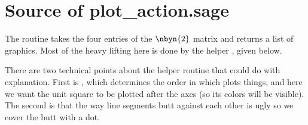 \section{Source of plot\_action.sage}
The 
routine takes the four entries of the $\nbyn{2}$
matrix and returns a list of graphics.
Most of the heavy lifting here
is done by the helper , 
given below.


There are two technical points about the helper routine that could do with 
explanation. 
First is , which determines the order in which 
\Sage{} plots things, and here we want the unit square to be plotted
after the axes (so its colors will be visible).
The second is that the way line segments butt against each other is ugly 
so we cover the butt with a dot.



\endinput


TODO:
